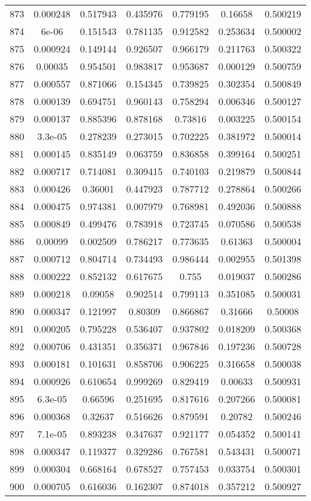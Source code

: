 \begin{table}
\begin{tabular}{c|c|c|c|c|c|c}
873 & 0.000248 & 0.517943 & 0.435976 & 0.779195 & 0.16658 & 0.500219\\
874 & 6e-06 & 0.151543 & 0.781135 & 0.912582 & 0.253634 & 0.500002\\
875 & 0.000924 & 0.149144 & 0.926507 & 0.966179 & 0.211763 & 0.500322\\
876 & 0.00035 & 0.954501 & 0.983817 & 0.953687 & 0.000129 & 0.500759\\
877 & 0.000557 & 0.871066 & 0.154345 & 0.739825 & 0.302354 & 0.500849\\
878 & 0.000139 & 0.694751 & 0.960143 & 0.758294 & 0.006346 & 0.500127\\
879 & 0.000137 & 0.885396 & 0.878168 & 0.73816 & 0.003225 & 0.500154\\
880 & 3.3e-05 & 0.278239 & 0.273015 & 0.702225 & 0.381972 & 0.500014\\
881 & 0.000145 & 0.835149 & 0.063759 & 0.836858 & 0.399164 & 0.500251\\
882 & 0.000717 & 0.714081 & 0.309415 & 0.740103 & 0.219879 & 0.500844\\
883 & 0.000426 & 0.36001 & 0.447923 & 0.787712 & 0.278864 & 0.500266\\
884 & 0.000475 & 0.974381 & 0.007979 & 0.768981 & 0.492036 & 0.500888\\
885 & 0.000849 & 0.499476 & 0.783918 & 0.723745 & 0.070586 & 0.500538\\
886 & 0.00099 & 0.002509 & 0.786217 & 0.773635 & 0.61363 & 0.500004\\
887 & 0.000712 & 0.804714 & 0.734493 & 0.986444 & 0.002955 & 0.501398\\
888 & 0.000222 & 0.852132 & 0.617675 & 0.755 & 0.019037 & 0.500286\\
889 & 0.000218 & 0.09058 & 0.902514 & 0.799113 & 0.351085 & 0.500031\\
890 & 0.000347 & 0.121997 & 0.80309 & 0.866867 & 0.31666 & 0.50008\\
891 & 0.000205 & 0.795228 & 0.536407 & 0.937802 & 0.018209 & 0.500368\\
892 & 0.000706 & 0.431351 & 0.356371 & 0.967846 & 0.197236 & 0.500728\\
893 & 0.000181 & 0.101631 & 0.858706 & 0.906225 & 0.316658 & 0.500038\\
894 & 0.000926 & 0.610654 & 0.999269 & 0.829419 & 0.00633 & 0.500931\\
895 & 6.3e-05 & 0.66596 & 0.251695 & 0.817616 & 0.207266 & 0.500081\\
896 & 0.000368 & 0.32637 & 0.516626 & 0.879591 & 0.20782 & 0.500246\\
897 & 7.1e-05 & 0.893238 & 0.347637 & 0.921177 & 0.054352 & 0.500141\\
898 & 0.000347 & 0.119377 & 0.329286 & 0.767581 & 0.543431 & 0.500071\\
899 & 0.000304 & 0.668164 & 0.678527 & 0.757453 & 0.033754 & 0.500301\\
900 & 0.000705 & 0.616036 & 0.162307 & 0.874018 & 0.357212 & 0.500927\\
\end{tabular}
\end{table}

